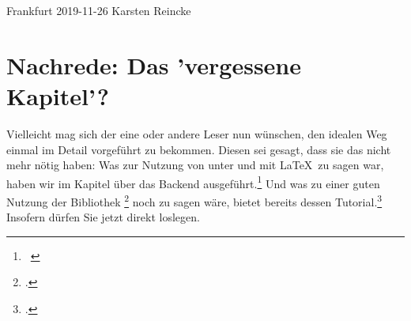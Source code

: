Frankfurt 2019-11-26
Karsten Reincke

\chapter{Nachrede: Das 'vergessene Kapitel'?}

Vielleicht mag sich der eine oder andere Leser nun wünschen, den idealen Weg
einmal im Detail vorgeführt zu bekommen. Diesen sei gesagt, dass sie das nicht
mehr nötig haben: Was zur Nutzung von  unter und mit \LaTeX\ zu
sagen war, haben wir im Kapitel über das Backend 
ausgeführt.\footnote{\ra\ \pageref{LilyPondBackend}} Und was zu einer guten
Nutzung der Bibliothek \footcite[vgl.][\nopage
wp.]{ReinckeBlum2019a} noch zu sagen wäre, bietet bereits dessen
Tutorial.\footcite[vgl.][]{Reincke2019b} Insofern dürfen Sie jetzt direkt
loslegen.

%
